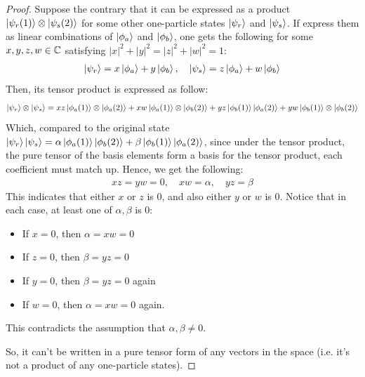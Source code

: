 \documentclass{article}
\begin{document}
\begin{proof}
    Suppose the contrary that it can be expressed as a product $\ket{\psi_r(1)}\otimes\ket{\psi_s(2)}$ for some other one-particle states $\ket{\psi_r}$ and $\ket{\psi_s}$. If express them as linear combinations of $\ket{\phi_a}$ and $\ket{\phi_b}$, one gets the following for some $x,y,z,w\in\mathbb{C}$ satisfying $|x|^2+|y|^2=|z|^2+|w|^2=1$:
    \begin{align}
        \ket{\psi_r} =x\ket{\phi_a}+y\ket{\phi_b},\quad \ket{\psi_s}=z\ket{\phi_a}+w\ket{\phi_b} 
    \end{align}
    Then, its tensor product is expressed as follow:
    \begin{align}
        \ket{\psi_r}\otimes\ket{\psi_s} = xz\ket{\phi_a(1)}\otimes\ket{\phi_a(2)}+xw\ket{\phi_a(1)}\otimes\ket{\phi_b(2)}+yz\ket{\phi_b(1)}\ket{\phi_a(2)}+yw\ket{\phi_b(1)}\otimes\ket{\phi_b(2)}
    \end{align}
    Which, compared to the original state $\ket{\psi_r}\ket{\psi_s}=\alpha\ket{\phi_a(1)}\ket{\phi_b(2)}+\beta\ket{\phi_b(1)}\ket{\phi_a(2)}$, since under the tensor product, the pure tensor of the basis elements form a basis for the tensor product, each coefficient must match up. Hence, we get the following:
    \begin{align}
        xz = yw = 0,\quad xw = \alpha,\quad yz = \beta
    \end{align}
    This indicates that either $x$ or $z$ is $0$, and also either $y$ or $w$ is $0$. Notice that in each case, at least one of $\alpha,\beta$ is $0$:
    \begin{itemize}
        \item If $x=0$, then $\alpha=xw=0$
        \item If $z=0$, then $\beta=yz=0$
        \item If $y=0$, then $\beta=yz=0$ again
        \item If $w=0$, then $\alpha=xw=0$ again.
    \end{itemize}
    This contradicts the assumption that $\alpha,\beta\neq 0$.

    So, it can't be written in a pure tensor form of any vectors in the space (i.e. it's not a product of any one-particle states).
\end{proof}

\newpage
\end{document}

